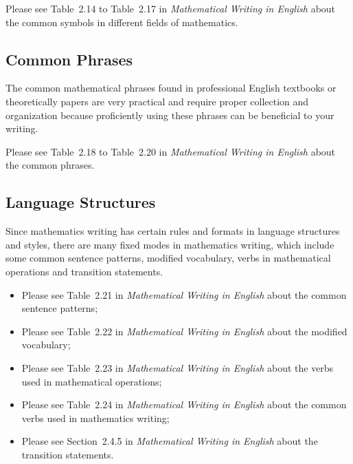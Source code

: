 Please see Table~2.14 to Table~2.17 in \emph{Mathematical Writing in English}\cite{2013数学之英文写作} about the common symbols in different fields of mathematics.


\subsection{Common Phrases}
The common mathematical phrases found in professional English textbooks or theoretically papers are very practical and require proper collection and organization because proficiently using these phrases can be beneficial to your writing.

Please see Table~2.18 to Table~2.20 in \emph{Mathematical Writing in English}\cite{2013数学之英文写作} about the common phrases.


\subsection{Language Structures}
Since mathematics writing has certain rules and formats in language structures and styles, there are many fixed modes in mathematics writing, which include some common sentence patterns, modified vocabulary, verbs in mathematical operations and transition statements.
\begin{itemize}[label={\dag}]
	\item Please see Table~2.21 in \emph{Mathematical Writing in English}\cite{2013数学之英文写作} about the common sentence patterns;
	\item Please see Table~2.22 in \emph{Mathematical Writing in English}\cite{2013数学之英文写作} about the modified vocabulary;
	\item Please see Table~2.23 in \emph{Mathematical Writing in English}\cite{2013数学之英文写作} about the verbs used in mathematical operations;
	\item Please see Table~2.24 in \emph{Mathematical Writing in English}\cite{2013数学之英文写作} about the common verbs used in mathematics writing;
	\item Please see Section~2.4.5 in \emph{Mathematical Writing in English}\cite{2013数学之英文写作} about the transition statements.
\end{itemize}



% 
